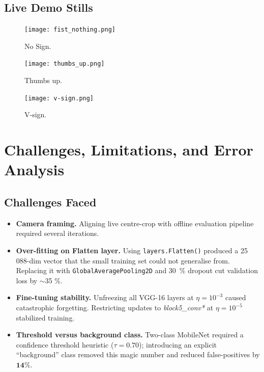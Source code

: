 \documentclass[a4paper,12pt]{article}
\begin{document}
\subsection{Live Demo Stills}
\begin{figure}[H]      
    \centering
    \graphicspath{{figures/Demo/}}
    \texttt{[image: fist\_nothing.png]}\par\medskip
    \caption{No Sign.}
    \label{fig:no_sign}
 \end{figure}

\begin{figure}[H]      
    \centering
    \graphicspath{{figures/Demo/}}
    \texttt{[image: thumbs\_up.png]}\par
    \caption{Thumbs up.}
    \label{fig:thumb}
\end{figure}

\begin{figure}[H]      
    \centering
    \graphicspath{{figures/Demo/}}
    \texttt{[image: v-sign.png]}\par
    \caption{V-sign.}
    \label{fig:V}
\end{figure}


\section{Challenges, Limitations, and Error Analysis}
\label{sec:challenges}

\subsection{Challenges Faced}
\begin{itemize}
  \item \textbf{Camera framing.} Aligning live centre-crop with offline
        evaluation pipeline required several iterations.
  \item \textbf{Over-fitting on Flatten layer.} Using
        \verb|layers.Flatten()| produced a 25 088-dim vector that the
        small training set could not generalise from.  Replacing it with
        \verb|GlobalAveragePooling2D| and \SI{30}{\percent} dropout cut
        validation loss by \(\sim\)35 \%.
  \item \textbf{Fine-tuning stability.} Unfreezing all VGG-16 layers at
        \(\eta = 10^{-3}\) caused catastrophic forgetting.  Restricting
        updates to \emph{block5\_conv*} at \(\eta = 10^{-5}\) stabilized
        training.
  \item \textbf{Threshold versus background class.}
        Two-class MobileNet required a confidence threshold heuristic
        (\(\tau = 0.70\)); introducing an explicit “background” class
        removed this magic number and reduced false-positives by
        \(\mathbf{14\%}\).
\end{itemize}
\end{document}
